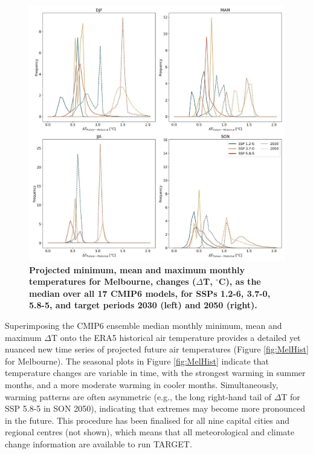 \documentclass[final,3p,times,authoryear]{elsarticle}
\begin{document}
\begin{figure}
\centering
\includegraphics[trim={30 30 20 30},clip,scale=0.15]{images/image2.jpg}
\caption{\bf Projected minimum, mean and maximum monthly temperatures for Melbourne, changes ($\Delta$T, $^{\circ}$C), as the median over all 17 CMIP6 models, for SSPs 1.2-6, 3.7-0, 5.8-5, and target periods 2030 (left) and 2050 (right).}
 \label{fig:MelCmip}
\end{figure}

Superimposing the CMIP6 ensemble median monthly minimum, mean and maximum $\Delta$T onto the ERA5 historical air temperature provides a detailed yet nuanced new time series of projected future air temperatures (Figure \ref{fig:MelHist} for Melbourne).  The seasonal plots in Figure \ref{fig:MelHist} indicate that temperature changes are variable in time, with the strongest warming in summer months, and a more moderate warming in cooler months. Simultaneously, warming patterns are often asymmetric (e.g., the long right-hand tail of $\Delta$T for SSP 5.8-5 in SON 2050), indicating that extremes may become more pronounced in the future.
This procedure has been finalised for all nine capital cities and regional centres (not shown), which means that all meteorological and climate change information are available to run TARGET.
\end{document}
